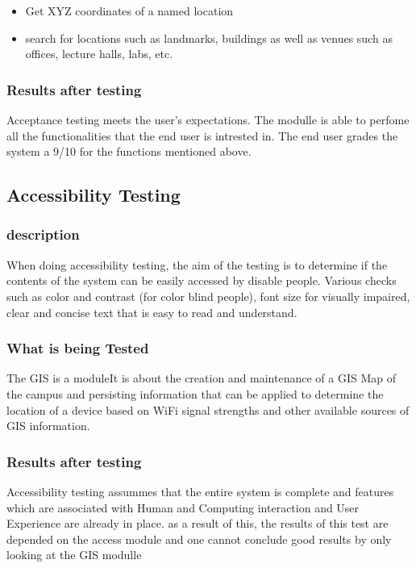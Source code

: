 \documentclass[12pt]{article}
\begin{document}
		\begin {itemize}
 			 \item Get XYZ coordinates of a named location
			  \item  search for locations such as landmarks, buildings as well as venues such as offices, 							lecture halls, labs, etc.
		\end {itemize}
		
		
		\subsubsection{Results after testing}
		Acceptance testing meets the user's expectations. The modulle is able to perfome all the functionalities that the end 			user is intrested in. 
		The end user grades the system a 9/10 for the functions mentioned above.
		
		
	\subsection{Accessibility Testing}
		\subsubsection{description}
		When doing accessibility testing, the aim of the testing is to determine if the contents of the system can be easily 			accessed by disable people. Various checks such as color and contrast (for color blind people), font size for visually 			impaired, clear and concise text that is easy to read and understand.
		
		\subsubsection{What is being Tested}
		The GIS is a moduleIt is about the creation and maintenance of a GIS Map of the campus and persisting information that 			can be applied to determine the location of a device based on WiFi signal strengths and other available sources of GIS 			information.
		\subsubsection{Results after testing}
		Accessibility testing assummes that the entire system is complete and features which are associated with Human and 			Computing interaction and User Experience are already in place. as a result of this, the results of this test are depended on the access 			module and one cannot conclude good results by only looking at the GIS modulle 
	
\end{document}
